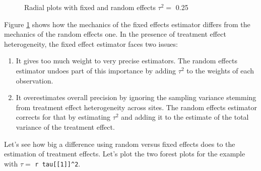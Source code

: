 \documentclass[]{book}
\newenvironment{Shaded}{\begin{snugshade}}{\end{snugshade}}
\newcommand{\KeywordTok}[1]{\textcolor[rgb]{0.13,0.29,0.53}{\textbf{#1}}}
\newcommand{\DataTypeTok}[1]{\textcolor[rgb]{0.13,0.29,0.53}{#1}}
\newcommand{\DecValTok}[1]{\textcolor[rgb]{0.00,0.00,0.81}{#1}}
\newcommand{\StringTok}[1]{\textcolor[rgb]{0.31,0.60,0.02}{#1}}
\newcommand{\OperatorTok}[1]{\textcolor[rgb]{0.81,0.36,0.00}{\textbf{#1}}}
\newcommand{\NormalTok}[1]{#1}
\providecommand{\tightlist}{%
  \setlength{\itemsep}{0pt}\setlength{\parskip}{0pt}}
\theoremstyle{definition}
\theoremstyle{definition}
\theoremstyle{definition}
\theoremstyle{remark}
\let\BeginKnitrBlock\begin \let\EndKnitrBlock\end
\begin{document}
\begin{Shaded}
\end{Shaded}

\begin{figure}[htbp]

{\centering {}

}

\caption{Radial plots with fixed and random effects $\tau^2=$ 0.25}\label{fig:Radial}
\end{figure}

Figure \ref{fig:Radial} shows how the mechanics of the fixed effects
estimator differs from the mechanics of the random effects one. In the
presence of treatment effect heterogeneity, the fixed effect estimator
faces two issues:

\begin{enumerate}
\def\labelenumi{\arabic{enumi}.}
\tightlist
\item
  It gives too much weight to very precise estimators. The random
  effects estimator undoes part of this importance by adding \(\tau^2\)
  to the weights of each observation.
\item
  It overestimates overall precision by ignoring the sampling variance
  stemming from treatment effect heterogeneity across sites. The random
  effects estimator corrects for that by estimating \(\tau^2\) and
  adding it to the estimate of the total variance of the treatment
  effect.
\end{enumerate}

\BeginKnitrBlock{example}
\protect\hypertarget{exm:unnamed-chunk-153}{}{\label{exm:unnamed-chunk-153}
}Let's see how big a difference using random versus fixed effects does
to the estimation of treatment effects. Let's plot the two forest plots
for the example with \(\tau=\) \texttt{r\ tau{[}{[}1{]}{]}\^{}2}.
\EndKnitrBlock{example}
\end{document}
